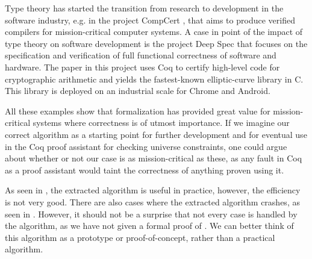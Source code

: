 Type theory has started the transition from research to development in
the software industry, e.g. in the project CompCert \cite{compcert},
that aims to produce verified compilers for mission-critical computer systems.
A case in point of the impact of type theory on software development is the project Deep Spec
\cite{deepspec} that focuses on the specification and verification of full functional
correctness of software and hardware. The paper \cite{secpriv} in this project uses Coq to certify high-level
code for cryptographic arithmetic and yields the fastest-known elliptic-curve library in C.
This library is deployed on an industrial scale for Chrome and Android.

All these examples show that formalization has provided great value for mission-critical
systems where correctness is of utmost importance.
If we imagine our correct algorithm as a starting point for further development
and for eventual use in the Coq proof assistant for checking universe constraints,
one could argue about whether or not our case is as mission-critical as these,
as any fault in Coq as a proof assistant would taint the correctness of anything proven using it.

As seen in , the extracted algorithm is useful in practice,
however, the efficiency is not very good.
There are also cases where the extracted algorithm crashes, as seen in .
However, it should not be a surprise that not every case is handled by the algorithm,
as we have not given a formal proof of .
We can better think of this algorithm as a prototype or proof-of-concept,
rather than a practical algorithm.
